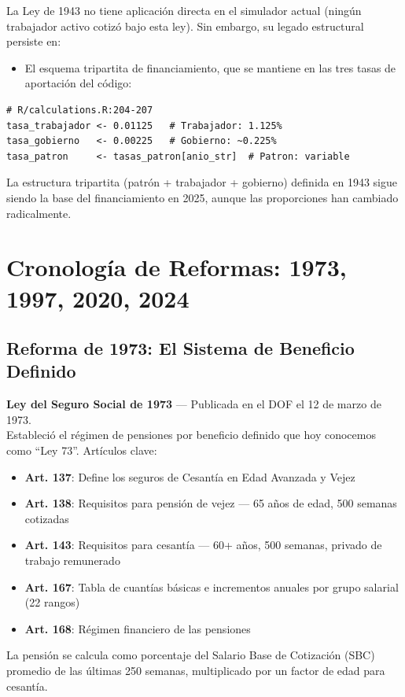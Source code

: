 \documentclass[11pt,a4paper]{report}
\begin{document}
\begin{tcolorbox}[colback=orange!5!white, colframe=orange!75!black, title=\textbf{Aplicaci\'on en C\'odigo}]
La Ley de 1943 no tiene aplicaci\'on directa en el simulador actual (ning\'un trabajador activo cotiz\'o bajo esta ley). Sin embargo, su legado estructural persiste en:

\begin{itemize}
\item El esquema tripartita de financiamiento, que se mantiene en las tres tasas de aportaci\'on del c\'odigo:
\end{itemize}

\begin{lstlisting}
# R/calculations.R:204-207
tasa_trabajador <- 0.01125   # Trabajador: 1.125%
tasa_gobierno   <- 0.00225   # Gobierno: ~0.225%
tasa_patron     <- tasas_patron[anio_str]  # Patron: variable
\end{lstlisting}

La estructura tripartita (patr\'on + trabajador + gobierno) definida en 1943 sigue siendo la base del financiamiento en 2025, aunque las proporciones han cambiado radicalmente.
\end{tcolorbox}

\section{Cronolog\'ia de Reformas: 1973, 1997, 2020, 2024}

\subsection{Reforma de 1973: El Sistema de Beneficio Definido}

\begin{tcolorbox}[colback=blue!5!white, colframe=blue!75!black, title=\textbf{Definici\'on Formal}]
\textbf{Ley del Seguro Social de 1973} --- Publicada en el DOF el 12 de marzo de 1973.\\[0.3em]
Estableci\'o el r\'egimen de pensiones por beneficio definido que hoy conocemos como ``Ley 73''. Art\'iculos clave:
\begin{itemize}[nosep]
\item \textbf{Art. 137}: Define los seguros de Cesant\'ia en Edad Avanzada y Vejez
\item \textbf{Art. 138}: Requisitos para pensi\'on de vejez --- 65 a\~nos de edad, 500 semanas cotizadas
\item \textbf{Art. 143}: Requisitos para cesant\'ia --- 60+ a\~nos, 500 semanas, privado de trabajo remunerado
\item \textbf{Art. 167}: Tabla de cuant\'ias b\'asicas e incrementos anuales por grupo salarial (22 rangos)
\item \textbf{Art. 168}: R\'egimen financiero de las pensiones
\end{itemize}
La pensi\'on se calcula como porcentaje del Salario Base de Cotizaci\'on (SBC) promedio de las \'ultimas 250 semanas, multiplicado por un factor de edad para cesant\'ia.
\end{tcolorbox}
\end{document}

